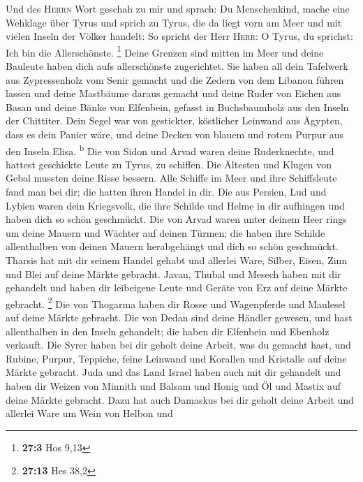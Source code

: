  Und des \textsc{Herrn} Wort geschah zu mir und sprach:
 Du Menschenkind, mache eine Wehklage über Tyrus
 und sprich zu Tyrus, die da liegt vorn am Meer und mit
vielen Inseln der Völker handelt: So spricht der Herr \textsc{Herr}: O
Tyrus, du sprichst: Ich bin die Allerschönste. \footnote{\textbf{27:3}
  Hos 9,13}  Deine Grenzen sind mitten im Meer und deine
Bauleute haben dich aufs allerschönste zugerichtet.  Sie
haben all dein Tafelwerk aus Zypressenholz vom Senir gemacht und die
Zedern von dem Libanon führen lassen und deine Mastbäume daraus gemacht
 und deine Ruder von Eichen aus Basan und deine Bänke von
Elfenbein, gefasst in Buchsbaumholz aus den Inseln der Chittiter.
 Dein Segel war von gestickter, köstlicher Leinwand aus
Ägypten, dass es dein Panier wäre, und deine Decken von blauem und rotem
Purpur aus den Inseln Elisa. \textsuperscript{b}  Die von
Sidon und Arvad waren deine Ruderknechte, und hattest geschickte Leute
zu Tyrus, zu schiffen.  Die Ältesten und Klugen von Gebal
mussten deine Risse bessern. Alle Schiffe im Meer und ihre Schiffsleute
fand man bei dir; die hatten ihren Handel in dir.  Die
aus Persien, Lud und Lybien waren dein Kriegsvolk, die ihre Schilde und
Helme in dir aufhingen und haben dich so schön geschmückt.
 Die von Arvad waren unter deinem Heer rings um deine
Mauern und Wächter auf deinen Türmen; die haben ihre Schilde
allenthalben von deinen Mauern herabgehängt und dich so schön
geschmückt.  Tharsis hat mit dir seinem Handel gehabt und
allerlei Ware, Silber, Eisen, Zinn und Blei auf deine Märkte gebracht.
 Javan, Thubal und Mesech haben mit dir gehandelt und
haben dir leibeigene Leute und Geräte von Erz auf deine Märkte gebracht.
\footnote{\textbf{27:13} Hes 38,2}  Die von Thogarma
haben dir Rosse und Wagenpferde und Maulesel auf deine Märkte gebracht.
 Die von Dedan sind deine Händler gewesen, und hast
allenthalben in den Inseln gehandelt; die haben dir Elfenbein und
Ebenholz verkauft.  Die Syrer haben bei dir geholt deine
Arbeit, was du gemacht hast, und Rubine, Purpur, Teppiche, feine
Leinwand und Korallen und Kristalle auf deine Märkte gebracht.
 Juda und das Land Israel haben auch mit dir gehandelt
und haben dir Weizen von Minnith und Balsam und Honig und Öl und Mastix
auf deine Märkte gebracht.  Dazu hat auch Damaskus bei
dir geholt deine Arbeit und allerlei Ware um Wein von Helbon und

